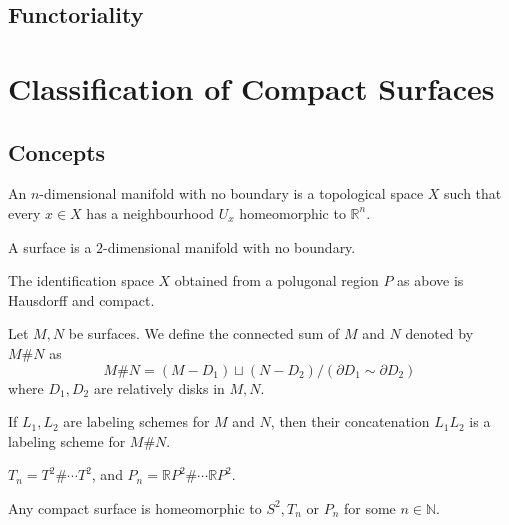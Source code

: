 \documentclass{article}
\begin{document}
\subsection{Functoriality}

\section{Classification of Compact Surfaces}

\subsection{Concepts}

\begin{definition}
    An $n$-dimensional manifold with no boundary is a topological space $X$ such that every $x\in X$ has a neighbourhood $U_x$ homeomorphic to $\mathbb{R}^n$.
\end{definition}

\begin{definition}
    A surface is a $2$-dimensional manifold with no boundary.
\end{definition}

\begin{proposition}
    The identification space $X$ obtained from a polugonal region $P$ as above is Hausdorff and compact.
\end{proposition}

\begin{definition}
    Let $M,N$ be surfaces. We define the connected sum of $M$ and $N$ denoted by $M\# N$ as
    \[M\#N = (M-D_1)\sqcup(N-D_2) / (\partial D_1 \sim \partial D_2)\]
    where $D_1,D_2$ are relatively disks in $M,N$.
\end{definition}

\begin{lemma}
    If $L_1,L_2$ are labeling schemes for $M$ and $N$, then their concatenation $L_1L_2$ is a labeling scheme for $M\# N$.
\end{lemma}

\begin{definition}
    $T_n = T^2 \# \cdots T^2$, and $P_n = \mathbb{R}P^2\# \cdots \mathbb{R}P^2$.
\end{definition}

\begin{theorem}
    Any compact surface is homeomorphic to $S^2, T_n$ or $P_n$ for some $n\in \mathbb{N}$.
\end{theorem}
\end{document}
